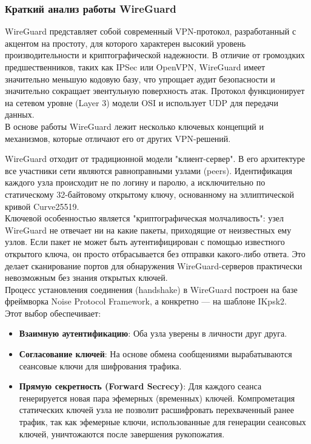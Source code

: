 \subsubsection{Краткий анализ работы WireGuard}
WireGuard представляет собой современный VPN-протокол, разработанный с акцентом на простоту, для которого характерен высокий уровень производительности и криптографической надежности.
В отличие от громоздких предшественников, таких как IPSec или OpenVPN, WireGuard имеет значительно меньшую кодовую базу, что упрощает аудит безопасности и значительно сокращает эвентульную поверхность атак.
Протокол функционирует на сетевом уровне (Layer 3) модели OSI и использует UDP для передачи данных.~\cite{wireguard}\\

В основе работы WireGuard лежит несколько ключевых концепций и механизмов, которые отличают его от других VPN-решений.

WireGuard отходит от традиционной модели "клиент-сервер".
В его архитектуре все участники сети являются равноправными узлами (peers).
Идентификация каждого узла происходит не по логину и паролю, а исключительно по статическому 32-байтовому открытому ключу, основанному на эллиптической кривой Curve25519.\\

Ключевой особенностью является "криптографическая молчаливость": узел WireGuard не отвечает ни на какие пакеты, приходящие от неизвестных ему узлов.
Если пакет не может быть аутентифицирован с помощью известного открытого ключа, он просто отбрасывается без отправки какого-либо ответа.
Это делает сканирование портов для обнаружения WireGuard-серверов практически невозможным без знания открытых ключей.\\

Процесс установления соединения (handshake) в WireGuard построен на базе фреймворка Noise Protocol Framework, а конкретно — на шаблоне IKpsk2.\\

Этот выбор обеспечивает:
\begin{itemize}
    \item \textbf{Взаимную аутентификацию}: Оба узла уверены в личности друг друга.
    \item \textbf{Согласование ключей}: На основе обмена сообщениями вырабатываются сеансовые ключи для шифрования трафика.
    \item \textbf{Прямую секретность (Forward Secrecy)}: Для каждого сеанса генерируется новая пара эфемерных (временных) ключей.
    Компрометация статических ключей узла не позволит расшифровать перехваченный ранее трафик, так как эфемерные ключи, использованные для генерации сеансовых ключей, уничтожаются после завершения рукопожатия.
\end{itemize}

